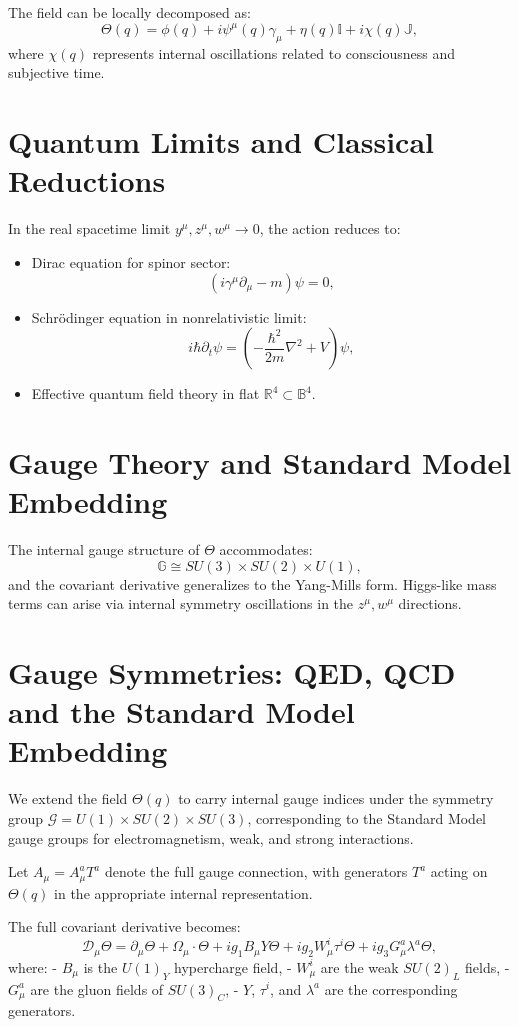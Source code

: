 \documentclass[12pt]{article}
\begin{document}
The field can be locally decomposed as:
\[
\Theta(q) = \phi(q) + i \psi^\mu(q) \gamma_\mu + \eta(q) \mathbb{I} + i \chi(q) \mathbb{J},
\]
where \( \chi(q) \) represents internal oscillations related to consciousness and subjective time.

\section{Quantum Limits and Classical Reductions}

In the real spacetime limit \( y^\mu, z^\mu, w^\mu \to 0 \), the action reduces to:
\begin{itemize}
  \item Dirac equation for spinor sector:
  \[
  (i \gamma^\mu \partial_\mu - m) \psi = 0,
  \]
  \item Schrödinger equation in nonrelativistic limit:
  \[
  i \hbar \partial_t \psi = \left( -\frac{\hbar^2}{2m} \nabla^2 + V \right) \psi,
  \]
  \item Effective quantum field theory in flat \( \mathbb{R}^4 \subset \mathbb{B}^4 \).
\end{itemize}


\section{Gauge Theory and Standard Model Embedding}

The internal gauge structure of \( \Theta \) accommodates:
\[
\mathbb{G} \cong SU(3) \times SU(2) \times U(1),
\]
and the covariant derivative generalizes to the Yang-Mills form. Higgs-like mass terms can arise via internal symmetry oscillations in the \( z^\mu, w^\mu \) directions.

\section{Gauge Symmetries: QED, QCD and the Standard Model Embedding}

We extend the field \(\Theta(q)\) to carry internal gauge indices under the symmetry group \( \mathcal{G} = U(1) \times SU(2) \times SU(3) \), corresponding to the Standard Model gauge groups for electromagnetism, weak, and strong interactions.

Let \(A_\mu = A_\mu^a T^a\) denote the full gauge connection, with generators \(T^a\) acting on \(\Theta(q)\) in the appropriate internal representation.

The full covariant derivative becomes:
\[
\mathcal{D}_\mu \Theta = \partial_\mu \Theta + \Omega_\mu \cdot \Theta + i g_1 B_\mu Y \Theta + i g_2 W_\mu^i \tau^i \Theta + i g_3 G_\mu^a \lambda^a \Theta,
\]
where:
- \(B_\mu\) is the \(U(1)_Y\) hypercharge field,
- \(W_\mu^i\) are the weak \(SU(2)_L\) fields,
- \(G_\mu^a\) are the gluon fields of \(SU(3)_C\),
- \(Y\), \(\tau^i\), and \(\lambda^a\) are the corresponding generators.
\end{document}
